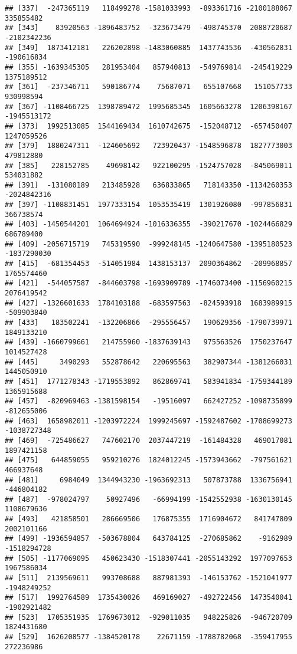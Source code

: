 \documentclass[
]{article}
\begin{document}
\begin{verbatim}
## [337]  -247365119   118499278 -1581033993  -893361716 -2100188067   335855482
## [343]    83920563 -1896483752  -323673479  -498745370  2088720687 -2102342236
## [349]  1873412181   226202898 -1483060885  1437743536  -430562831  -190616834
## [355] -1639345305   281953404   857940813  -549769814  -245419229  1375189512
## [361]  -237346711   590186774    75687071   655107668   151057733   930998594
## [367] -1108466725  1398789472  1995685345  1605663278  1206398167 -1945513172
## [373]  1992513085  1544169434  1610742675  -152048712  -657450407  1247059526
## [379]  1880247311  -124605692   723920437 -1548596878  1827773003   479812880
## [385]   228152785    49698142   922100295 -1524757028  -845069011   534031882
## [391]  -131080189   213485928   636833865   718143350 -1134260353 -2024842316
## [397] -1108831451  1977333154  1053535419  1301926080  -997856831   366738574
## [403] -1450544201  1064694924 -1016336355  -390217670 -1024466829   686789400
## [409] -2056715719   745319590  -999248145 -1240647580 -1395180523 -1837290030
## [415]  -681354453  -514051984  1438153137  2090364862  -209968857  1765574460
## [421]  -544057587  -844603798 -1693909789 -1746073400 -1156960215  2076419542
## [427] -1326601633  1784103188  -683597563  -824593918  1683989915  -509903840
## [433]   183502241  -132206866  -295556457   190629356 -1790739971  1849133210
## [439] -1660799661   214755960 -1837639143   975563526  1750237647  1014527428
## [445]     3490293   552878642   220695563   382907344 -1381266031  1445050910
## [451]  1771278343 -1719553892   862869741   583941834 -1759344189  1365915688
## [457]  -820969463 -1381598154   -19516097   662427252 -1098735899  -812655006
## [463]  1658982011 -1203972224  1999245697 -1592487602 -1708699273 -1038727348
## [469]  -725486627   747602170  2037447219  -161484328   469017081  1897421158
## [475]   644859055   959210276  1824012245 -1573943662  -797561621   466937648
## [481]     6984049  1344943230 -1963692313   507873788  1336756941  -446804182
## [487]  -978024797    50927496   -66994199 -1542552938 -1630130145  1108679636
## [493]   421858501   286669506   176875355  1716904672   841747809  2002101166
## [499] -1936594857  -503678804   643784125  -270685862    -9162989 -1518294728
## [505] -1177069095   450623430 -1518307441 -2055143292  1977097653  1967586034
## [511]  2139569611   993708688   887981393  -146153762 -1521041977 -1948249252
## [517]  1992764589  1735430026   469169027  -492722456  1473540041 -1902921482
## [523]  1705351935  1769673012  -929011035   948225826  -946720709  1824431680
## [529]  1626208577 -1384520178    22671159 -1788782068  -359417955   272236986

\end{verbatim}
\end{document}
